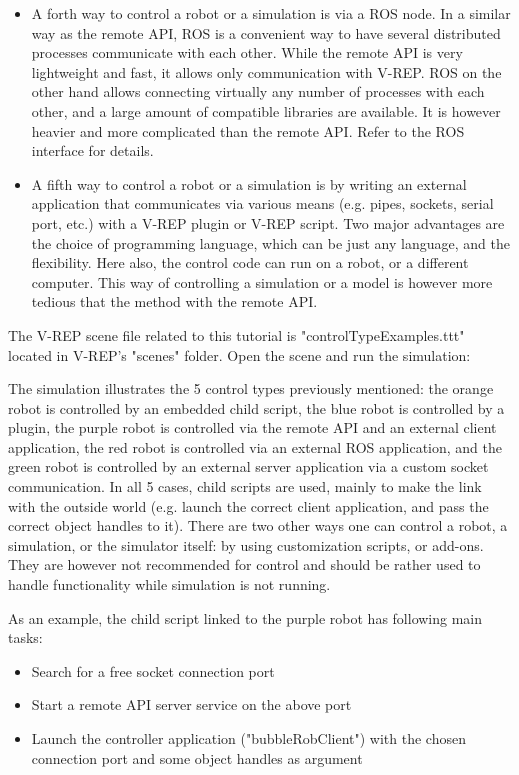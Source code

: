\begin{itemize}
\item A forth way to control a robot or a simulation is via a ROS node. 
	In a similar way as the remote API, ROS is a convenient way to have 
	several distributed processes communicate with each other. While the 
	remote API is very lightweight and fast, it allows only communication 
	with V-REP. ROS on the other hand allows connecting virtually any 
	number of processes with each other, and a large amount of compatible
	libraries are available. It is however heavier and more complicated
	than the remote API. Refer to the ROS interface for details.

\item A fifth way to control a robot or a simulation is by writing an 
	external application that communicates via various means (e.g. pipes, 
	sockets, serial port, etc.) with a V-REP plugin or V-REP script. Two 
	major advantages are the choice of programming language, which can be 
	just any language, and the flexibility. Here also, the control code 
	can run on a robot, or a different computer. This way of controlling 
	a simulation or a model is however more tedious that the method with
	the remote API.

\end{itemize}

The V-REP scene file related to this tutorial is "controlTypeExamples.ttt" 
located in V-REP's "scenes" folder. Open the scene and run the simulation:


The simulation illustrates the 5 control types previously mentioned: the 
orange robot is controlled by an embedded child script, the blue robot is 
controlled by a plugin, the purple robot is controlled via the remote API 
and an external client application, the red robot is controlled via an 
external ROS application, and the green robot is controlled by an external 
server application via a custom socket communication. In all 5 cases, child 
scripts are used, mainly to make the link with the outside world (e.g. 
launch the correct client application, and pass the correct object handles 
to it). There are two other ways one can control a robot, a simulation, or
the simulator itself: by using customization scripts, or add-ons. They are
however not recommended for control and should be rather used to handle
functionality while simulation is not running.

As an example, the child script linked to the purple robot has following 
main tasks:
\begin{itemize}[nosep]
	\item Search for a free socket connection port
	\item Start a remote API server service on the above port
	\item Launch the controller application ("bubbleRobClient") with the
		chosen connection port and some object handles as argument
\end{itemize}


